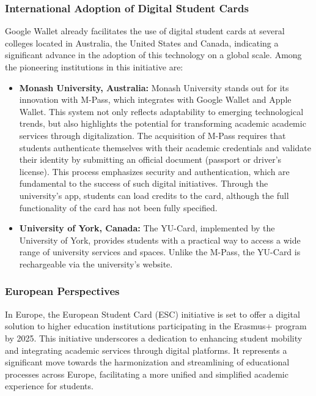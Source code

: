 \documentclass[10pt]{article}
\begin{document}
\subsubsection{International Adoption of Digital Student Cards}
Google Wallet already facilitates the use of digital student cards at
several colleges located in Australia, the United States and Canada, indicating
a significant advance in the adoption of this technology on a global scale. Among the
pioneering institutions in this initiative are:

\begin{itemize}
    \item \textbf{Monash University, Australia: }Monash University stands out for its
          innovation with M-Pass, which integrates with Google Wallet and Apple Wallet.
          This system not only reflects adaptability to emerging technological
          trends, but also highlights the potential for transforming academic
          academic services through digitalization. The acquisition of M-Pass requires
          that students authenticate themselves with their academic credentials and
          validate their identity by submitting an official document (passport or driver's license). This process emphasizes security and
          authentication, which are fundamental to the success of such digital initiatives.
          Through the university's app, students can load credits
          to the card, although the full functionality of the card has not been
          fully specified.
    \item \textbf{University of York, Canada: }The YU-Card, implemented by the University of
          York, provides students with a practical way to access a wide range of
          university services and spaces. Unlike the M-Pass,
          the YU-Card is rechargeable via the university's website.
\end{itemize}

\subsubsection{European Perspectives}
In Europe, the European Student Card (ESC) initiative is set to offer a digital solution to higher education institutions participating in the Erasmus+ program by 2025. This initiative underscores a dedication to enhancing student mobility and integrating academic services through digital platforms. It represents a significant move towards the harmonization and streamlining of educational processes across Europe, facilitating a more unified and simplified academic experience for students.
\end{document}
